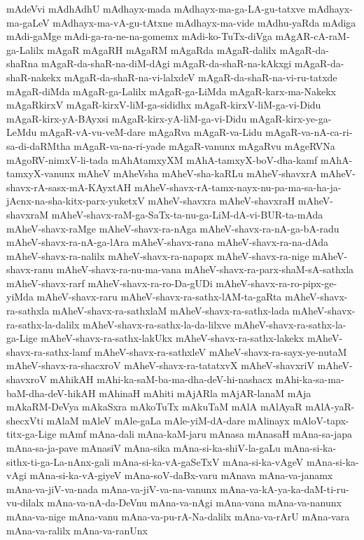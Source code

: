 {mAdeVvi
mAdhAdhU
mAdhayx-mada
mAdhayx-ma-ga-LA-gu-tatxve
mAdhayx-ma-gaLeV
mAdhayx-ma-vA-gu-tAtxne
mAdhayx-ma-vide
mAdhu-yaRda
mAdiga
mAdi-gaMge
mAdi-ga-ra-ne-na-gomemx
mAdi-ko-TuTx-diVga
mAgAR-cA-raM-ga-Lalilx
mAgaR
mAgaRH
mAgaRM
mAgaRda
mAgaR-dalilx
mAgaR-da-shaRna
mAgaR-da-shaR-na-diM-dAgi
mAgaR-da-shaR-na-kAkxgi
mAgaR-da-shaR-nakekx
mAgaR-da-shaR-na-vi-lalxdeV
mAgaR-da-shaR-na-vi-ru-tatxde
mAgaR-diMda
mAgaR-ga-Lalilx
mAgaR-ga-LiMda
mAgaR-karx-ma-Nakekx
mAgaRkirxV
mAgaR-kirxV-liM-ga-sididhx
mAgaR-kirxV-liM-ga-vi-Didu
mAgaR-kirx-yA-BAyxsi
mAgaR-kirx-yA-liM-ga-vi-Didu
mAgaR-kirx-ye-ga-LeMdu
mAgaR-vA-vu-veM-dare
mAgaRva
mAgaR-va-Lidu
mAgaR-va-nA-ca-ri-sa-di-daRMtha
mAgaR-va-na-ri-yade
mAgaR-vanunx
mAgaRvu
mAgeRVNa
mAgoRV-nimxV-li-tada
mAhAtamxyXM
mAhA-tamxyX-boV-dha-kamf
mAhA-tamxyX-vanunx
mAheV
mAheVsha
mAheV-sha-kaRLu
mAheV-shavxrA
mAheV-shavx-rA-sasx-mA-KAyxtAH
mAheV-shavx-rA-tamx-nayx-nu-pa-ma-sa-ha-ja-jAcnx-na-sha-kitx-parx-yuketxV
mAheV-shavxra
mAheV-shavxraH
mAheV-shavxraM
mAheV-shavx-raM-ga-SaTx-ta-nu-ga-LiM-dA-vi-BUR-ta-mAda
mAheV-shavx-raMge
mAheV-shavx-ra-nAga
mAheV-shavx-ra-nA-ga-bA-radu
mAheV-shavx-ra-nA-ga-lAra
mAheV-shavx-rana
mAheV-shavx-ra-na-dAda
mAheV-shavx-ra-nalilx
mAheV-shavx-ra-napapx
mAheV-shavx-ra-nige
mAheV-shavx-ranu
mAheV-shavx-ra-nu-ma-vana
mAheV-shavx-ra-parx-shaM-sA-sathxla
mAheV-shavx-rarf
mAheV-shavx-ra-ro-Da-gUDi
mAheV-shavx-ra-ro-pipx-ge-yiMda
mAheV-shavx-raru
mAheV-shavx-ra-sathx-lAM-ta-gaRta
mAheV-shavx-ra-sathxla
mAheV-shavx-ra-sathxlaM
mAheV-shavx-ra-sathx-lada
mAheV-shavx-ra-sathx-la-dalilx
mAheV-shavx-ra-sathx-la-da-lilxve
mAheV-shavx-ra-sathx-la-ga-Lige
mAheV-shavx-ra-sathx-lakUkx
mAheV-shavx-ra-sathx-lakekx
mAheV-shavx-ra-sathx-lamf
mAheV-shavx-ra-sathxleV
mAheV-shavx-ra-sayx-ye-nutaM
mAheV-shavx-ra-shacxroV
mAheV-shavx-ra-tatatxvX
mAheV-shavxriV
mAheV-shavxroV
mAhikAH
mAhi-ka-saM-ba-ma-dha-deV-hi-nashacx
mAhi-ka-sa-ma-baM-dha-deV-hikAH
mAhinaH
mAhiti
mAjARla
mAjAR-lanaM
mAja
mAkaRM-DeVya
mAkaSxra
mAkoTuTx
mAkuTaM
mAlA
mAlAyaR
mAlA-yaR-shecxVti
mAlaM
mAleV
mAle-gaLa
mAle-yiM-dA-dare
mAlinayx
mAloV-tapx-titx-ga-Lige
mAmf
mAna-dali
mAna-kaM-jaru
mAnasa
mAnasaH
mAna-sa-japa
mAna-sa-ja-pave
mAnasiV
mAna-sika
mAna-si-ka-shiV-la-gaLu
mAna-si-ka-sithx-ti-ga-La-nAnx-gali
mAna-si-ka-vA-gaSeTxV
mAna-si-ka-vAgeV
mAna-si-ka-vAgi
mAna-si-ka-vA-giyeV
mAna-soV-daBx-varu
mAnava
mAna-va-janamx
mAna-va-jiV-va-nada
mAna-va-jiV-va-na-vanunx
mAna-va-kA-ya-ka-daM-ti-ru-vu-dilalx
mAna-va-nA-da-DeVnu
mAna-va-nAgi
mAna-vana
mAna-va-nanunx
mAna-va-nige
mAna-vanu
mAna-va-pu-rA-Na-dalilx
mAna-va-rArU
mAna-vara
mAna-va-ralilx
mAna-va-ranUnx
}

